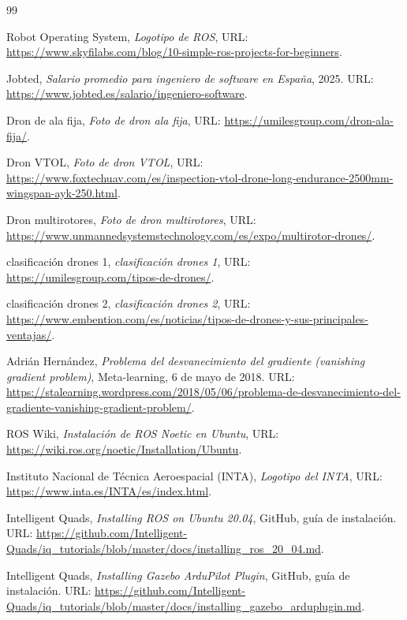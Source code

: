 \begin{thebibliography}{99}

 Robot Operating System, \textit{Logotipo de ROS}, URL: \url{https://www.skyfilabs.com/blog/10-simple-ros-projects-for-beginners}.

 Jobted, \textit{Salario promedio para ingeniero de software en España}, 2025. URL: \url{https://www.jobted.es/salario/ingeniero-software}.

 Dron de ala fija, \textit{Foto de dron ala fija}, URL: \url{https://umilesgroup.com/dron-ala-fija/}.

 Dron VTOL, \textit{Foto de dron VTOL}, URL: \url{https://www.foxtechuav.com/es/inspection-vtol-drone-long-endurance-2500mm-wingspan-ayk-250.html}.

 Dron multirotores, \textit{Foto de dron multirotores}, URL: \url{https://www.unmannedsystemstechnology.com/es/expo/multirotor-drones/}.

 clasificación drones 1, \textit{clasificación drones 1}, URL: \url{https://umilesgroup.com/tipos-de-drones/}.

 clasificación drones 2, \textit{clasificación drones 2}, URL: \url{https://www.embention.com/es/noticias/tipos-de-drones-y-sus-principales-ventajas/}.

 Adrián Hernández, \textit{Problema del desvanecimiento del gradiente (vanishing gradient problem)}, Meta-learning, 6 de mayo de 2018. URL: \url{https://stalearning.wordpress.com/2018/05/06/problema-de-desvanecimiento-del-gradiente-vanishing-gradient-problem/}.

 ROS Wiki, \textit{Instalación de ROS Noetic en Ubuntu}, URL: \url{https://wiki.ros.org/noetic/Installation/Ubuntu}.

 Instituto Nacional de Técnica Aeroespacial (INTA), \textit{Logotipo del INTA}, URL: \url{https://www.inta.es/INTA/es/index.html}.

 Intelligent Quads, \textit{Installing ROS on Ubuntu 20.04}, GitHub, guía de instalación. URL: \url{https://github.com/Intelligent-Quads/iq_tutorials/blob/master/docs/installing_ros_20_04.md}.

 Intelligent Quads, \textit{Installing Gazebo ArduPilot Plugin}, GitHub, guía de instalación. URL: \url{https://github.com/Intelligent-Quads/iq_tutorials/blob/master/docs/installing_gazebo_arduplugin.md}.


\end{thebibliography}
